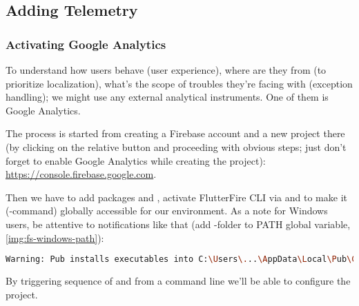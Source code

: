 
\subsection{Adding Telemetry}

\subsubsection{Activating Google Analytics}

To understand how users behave (user experience), where are they from (to prioritize localization), what's the scope of
troubles they're facing with (exception handling); we might use any external analytical instruments. One of them is 
Google Analytics.

The process is started from creating a Firebase account and a new project there (by clicking on the relative 
button and proceeding with obvious steps; just don't forget to enable Google Analytics while creating the project): 
\href{https://console.firebase.google.com}{https://console.firebase.google.com}.

Then we have to add packages  and , activate 
FlutterFire CLI  via  and  to make it 
(-command) globally accessible for our environment. As a note for Windows users, be attentive to 
notifications like that (add -folder to PATH global variable, \cref{img:fs-windows-path}):

\begin{lstlisting}[language=bash]
Warning: Pub installs executables into C:\Users\...\AppData\Local\Pub\Cache\bin, which is not on your path.
\end{lstlisting}

\noindent By triggering sequence of  and  from a command line 
we'll be able to configure the project.

